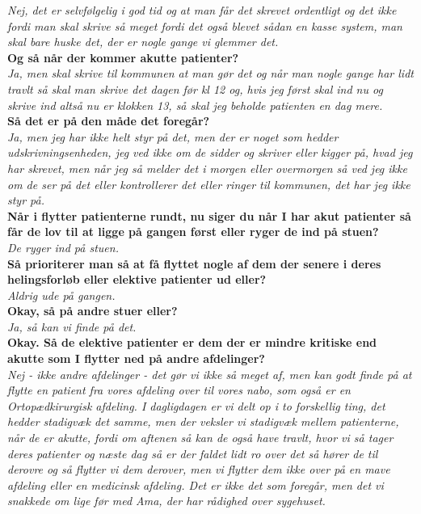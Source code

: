 \noindent
\textit{Nej, det er selvfølgelig i god tid og at man får det skrevet ordentligt og det ikke fordi man skal skrive så meget fordi det også blevet sådan en kasse system, man skal bare huske det, der er nogle gange vi glemmer det.}\\
\noindent
\textbf{Og så når der kommer akutte patienter?}\\
\noindent
\textit{Ja, men skal skrive til kommunen at man gør det og når man nogle gange har lidt travlt så skal man skrive det dagen før kl 12 og, hvis jeg først skal ind nu og skrive ind altså nu er klokken 13, så skal jeg beholde patienten en dag mere.}\\
\noindent
\textbf{Så det er på den måde det foregår?}\\
\noindent
\textit{Ja, men jeg har ikke helt styr på det, men der er noget som hedder udskrivningsenheden, jeg ved ikke om de sidder og skriver eller kigger på, hvad jeg har skrevet, men når jeg så melder det i morgen eller overmorgen så ved jeg ikke om de ser på det eller kontrollerer det eller ringer til kommunen, det har jeg ikke styr på.}\\
\noindent
\textbf{Når i flytter patienterne rundt, nu siger du når I har akut patienter så får de lov til at ligge på gangen først eller ryger de ind på stuen?}\\
\noindent
\textit{De ryger ind på stuen.}\\
\noindent
\textbf{Så prioriterer man så at få flyttet nogle af dem der senere i deres helingsforløb eller elektive patienter ud eller?}\\
\noindent
\textit{ Aldrig ude på gangen.}\\
\noindent
\textbf{Okay, så på andre stuer eller?}\\
\noindent
\textit{Ja, så kan vi finde på det.}\\
\noindent
\textbf{Okay. Så de elektive patienter er dem der er mindre kritiske end akutte som I flytter ned på andre afdelinger?} \\
\noindent
\textit{Nej - ikke andre afdelinger - det gør vi ikke så meget af, men kan godt finde på at flytte en patient fra vores afdeling over til vores nabo, som også er en Ortopædkirurgisk afdeling. I dagligdagen er vi delt op i to forskellig ting, det hedder stadigvæk det samme, men der veksler vi stadigvæk mellem patienterne, når de er akutte, fordi om aftenen så kan de også have travlt, hvor vi så tager deres patienter og næste dag så er der faldet lidt ro over det så hører de til derovre og så flytter vi dem derover, men vi flytter dem ikke over på en mave afdeling eller en medicinsk afdeling. Det er ikke det som foregår, men det vi snakkede om lige før med Ama, der har rådighed over sygehuset.}\\
